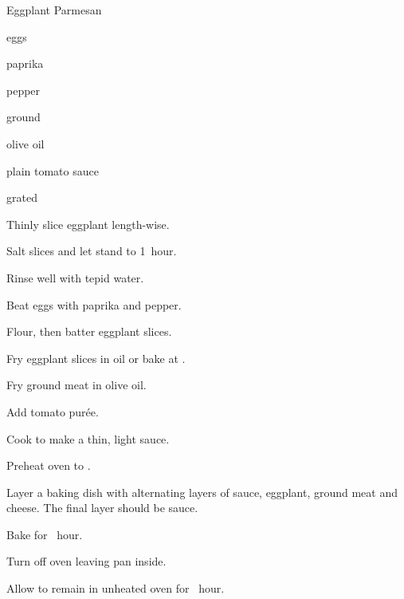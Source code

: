 \begin{recipe}{Eggplant Parmesan}{}{}

\begin{ingredients}
\item {}
\item eggs
\item paprika
\item pepper
\item ground 
\item olive oil
\item plain tomato sauce
\item grated 
\end{ingredients}

\begin{directions}
\item Thinly slice eggplant length-wise.
\item Salt slices and let stand \half{} to 1~hour.
\item Rinse well with tepid water.
\item Beat eggs with paprika and pepper.
\item Flour, then batter eggplant slices.
\item Fry eggplant slices in oil or bake at .
\item Fry ground meat in olive oil.
\item Add tomato pur\'ee.
\item Cook to make a thin, light sauce.
\item Preheat oven to .
\item Layer a baking dish with alternating layers of sauce, eggplant, ground meat and cheese. The final layer should be sauce.
\item Bake for \half~hour.
\item Turn off oven leaving pan inside.
\item Allow to remain in unheated oven for \half~hour.
\end{directions}

\end{recipe}
